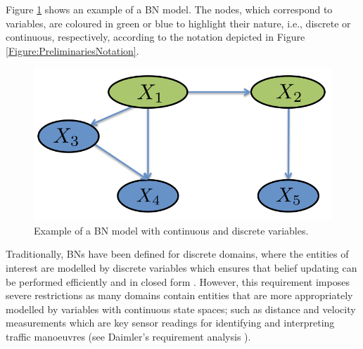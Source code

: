 Figure \ref{Figure:GeneralBayesianNetwork} shows an example of a BN model. The nodes, which correspond to variables, are coloured in green or blue to highlight their nature, i.e., discrete or continuous, respectively, according to the notation depicted in Figure \ref{Figure:PreliminariesNotation}. %

\begin{figure}[ht!]
\begin{center}
\includegraphics[scale=0.25]{./figures/PreliminariesGeneralBayesianNetwork}
\caption{\label{Figure:GeneralBayesianNetwork}Example of a BN model with continuous and discrete variables.
}
\end{center}
\end{figure}

Traditionally, BNs have been defined for discrete domains, where the entities of interest are modelled by discrete variables which ensures that belief updating can be performed efficiently and in closed form \cite{pearl1988probabilistic}. However, this requirement imposes severe restrictions as many domains contain entities that are more appropriately modelled by variables with continuous state spaces; such as distance and velocity measurements which are key sensor readings for identifying and interpreting traffic manoeuvres (see Daimler's requirement analysis \cite{Fer14}).

